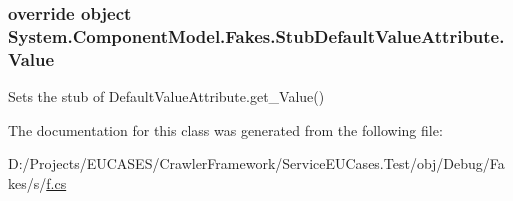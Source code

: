 \hypertarget{class_system_1_1_component_model_1_1_fakes_1_1_stub_default_value_attribute_a44bced2687d9bafef60cddee9a7e6930}{
\subsubsection[{Value}]{\setlength{\rightskip}{0pt plus 5cm}override object System.\-Component\-Model.\-Fakes.\-Stub\-Default\-Value\-Attribute.\-Value\hspace{0.3cm}{\ttfamily [get]}}}\label{class_system_1_1_component_model_1_1_fakes_1_1_stub_default_value_attribute_a44bced2687d9bafef60cddee9a7e6930}


Sets the stub of Default\-Value\-Attribute.\-get\-\_\-\-Value()



The documentation for this class was generated from the following file\-:\begin{DoxyCompactItemize}
\item 
D\-:/\-Projects/\-E\-U\-C\-A\-S\-E\-S/\-Crawler\-Framework/\-Service\-E\-U\-Cases.\-Test/obj/\-Debug/\-Fakes/s/\hyperlink{s_2f_8cs}{f.\-cs}\end{DoxyCompactItemize}
